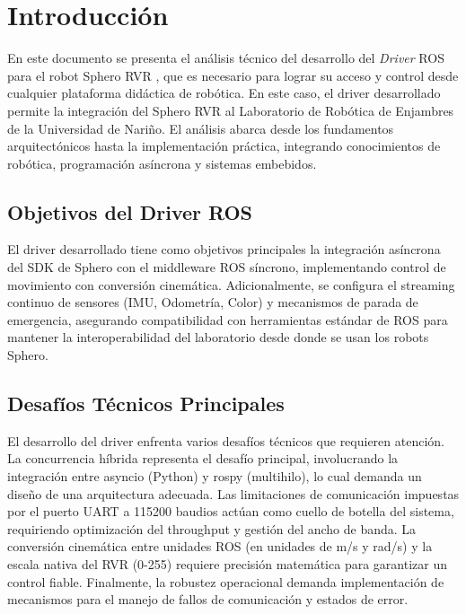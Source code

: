 \documentclass[11pt]{article}
\numberwithin{figure}{section}
\numberwithin{table}{section}
\begin{document}
\thispagestyle{indexpage}
\vspace*{1cm}
\listoftables
\newpage

\thispagestyle{fancy}
\mbox{} %
\newpage

\newcommand{\sectionbreak}{\clearpage}


\section{Introducción}

\justifying
En este documento se presenta el análisis técnico del desarrollo del \textit{Driver} ROS \cite{ROSWebsite} para el robot Sphero RVR \cite{Sphero_RVR_Plus}, que es necesario para lograr su acceso y control desde cualquier plataforma didáctica de robótica. En este caso, el driver desarrollado permite la integración del Sphero RVR al Laboratorio de Robótica de Enjambres de la Universidad de Nariño. El análisis abarca desde los fundamentos arquitectónicos hasta la implementación práctica, integrando conocimientos de robótica, programación asíncrona y sistemas embebidos.


\subsection{Objetivos del Driver ROS}

El driver desarrollado tiene como objetivos principales la integración asíncrona del SDK de Sphero con el middleware \cite{IBM_WhatIs_Middleware} ROS síncrono, implementando control de movimiento con conversión cinemática. Adicionalmente, se configura el streaming continuo de sensores (IMU, Odometría, Color) y mecanismos de parada de emergencia, asegurando compatibilidad con herramientas estándar de ROS para mantener la interoperabilidad del laboratorio desde donde se usan los robots Sphero.


\subsection{Desafíos Técnicos Principales}

El desarrollo del driver enfrenta varios desafíos técnicos que requieren atención. La concurrencia híbrida representa el desafío principal, involucrando la integración entre asyncio (Python) y rospy (multihilo), lo cual demanda un diseño de una arquitectura adecuada. Las limitaciones de comunicación impuestas por el puerto UART a 115200 baudios actúan como cuello de botella del sistema, requiriendo optimización del throughput y gestión del ancho de banda. La conversión cinemática entre unidades ROS (en unidades de m/s y rad/s) y la escala nativa del RVR (0-255) requiere precisión matemática para garantizar un control fiable. Finalmente, la robustez operacional demanda implementación de mecanismos para el manejo de fallos de comunicación y estados de error.
\end{document}
